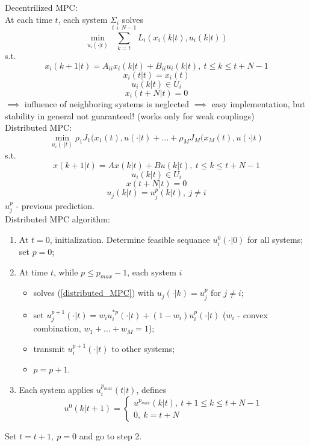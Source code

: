     
    Decentrilized MPC:\\
    At each time $t$, each system $\Sigma_i$ solves
    $$ \min_{u_i(\cdot|t)} \sum_{k=t}^{t+N-1} L_i(x_i(k|t), u_i(k|t))$$
    s.t. 
    $$x_i(k+1|t) = A_{ii}x_i(k|t)+B_{ii}u_i(k|t), \ t \le k \le t+N-1$$
    $$x_i(t|t) = x_i(t)$$
    $$u_i(k|t) \in U_i$$
    $$x_i(t+N|t) = 0$$
    $\implies$ influence of neighboring systems is neglected $\implies$ easy implementation, but stability in general not guaranteed! (works only for weak couplings)\\
    
    
    Distributed MPC:\\
    \begin{equation} \label{distributed_MPC}
        \min_{u_i(\cdot|t)} \rho_1J_1(x_1(t),u(\cdot|t)+\dots+\rho_MJ_M(x_M(t),u(\cdot|t)
    \end{equation}
    s.t. 
    $$x(k+1|t) = Ax(k|t)+Bu(k|t), \ t \le k \le t+N-1$$
    $$u_i(k|t) \in U_i$$
    $$x(t+N|t) = 0$$
    $$u_j(k|t) = u_j^p(k|t), \ j \neq i$$
    $u_j^p$ - previous prediction.\\
    
    Distributed MPC algorithm:\\
    \begin{enumerate}
        \item At $t=0$, initialization. Determine feasible sequance $u_i^0(\cdot|0)$ for all systems; set $p=0$;
        \item At time $t$, while $p \le p_{max} - 1$, each system $i$
        \begin{itemize}
            \item solves (\ref{distributed_MPC}) with $u_j(\cdot|k) = u_j^p$ for $j \neq i$;
            \item set $u_j^{p+1}(\cdot|t) = w_i u_i^{*p}(\cdot|t)+(1-w_i)u_i^p(\cdot|t)$ ($w_i$ - convex combination, $w_1 + \dots + w_M = 1$);
            \item transmit $u_i^{p+1}(\cdot|t)$ to other systems;
            \item $p=p+1$.
        \end{itemize}
        \item Each system applies $u_i^{p_{max}}(t|t)$, defines
        $$u^0(k|t+1) = \left \{ \begin{array}{ll} 
        u^{p_{max}}(k|t), \ t+1 \le k \le t+N-1 \\ 
        0, \ k = t+N 
        \end{array} \right.$$
    \end{enumerate}
    Set $t = t+1, \ p = 0$ and go to step 2.\\
    

